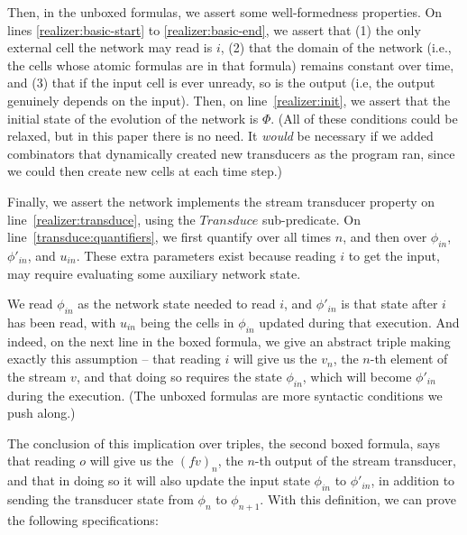 \documentclass[natbib]{sigplanconf}
\begin{document}
Then, in the unboxed formulas, we assert some well-formedness
properties. On lines \ref{realizer:basic-start} to
\ref{realizer:basic-end}, we assert that (1) the only external cell
the network may read is $i$, (2) that the domain of the network (i.e.,
the cells whose atomic formulas are in that formula) remains constant
over time, and (3) that if the input cell is ever unready, so is the
output (i.e, the output genuinely depends on the input). Then, on
line~\ref{realizer:init}, we assert that the initial state of the
evolution of the network is $\Phi$.  (All of these conditions could be
relaxed, but in this paper there is no need. It \emph{would}
be necessary if we added combinators that dynamically created new
transducers as the program ran, since we could then create new cells
at each time step.)

Finally, we assert the network implements the stream transducer 
property on line~\ref{realizer:transduce}, using the $\mathit{Transduce}$
sub-predicate. On line~\ref{transduce:quantifiers}, we first quantify
over all times $n$, and then over $\phi_{in}$, $\phi'_{in}$, and
$u_{in}$. These extra parameters exist because reading $i$ to get the
input, may require evaluating some auxiliary network state. 

We read $\phi_{in}$ as the network state needed to read $i$, and $\phi'_{in}$ is
that state after $i$ has been read, with $u_{in}$ being the cells in
$\phi_{in}$ updated during that execution.  And indeed, on the next line
in the boxed formula, we give an abstract triple making exactly this
assumption -- that reading $i$ will give us the $v_n$, the $n$-th
element of the stream $v$, and that doing so requires the state
$\phi_{in}$, which will become $\phi'_{in}$ during the execution. (The
unboxed formulas are more syntactic conditions we push along.)

The conclusion of this implication over triples, the second
boxed formula, says that reading $o$ will give us the $(f v)_n$, the
$n$-th output of the stream transducer, and that in doing so it will 
also update the input state $\phi_{in}$ to $\phi'_{in}$, in addition to 
sending the transducer state from $\phi_n$ to $\phi_{n+1}$. 
With this definition, we can prove the following specifications: 
\end{document}
